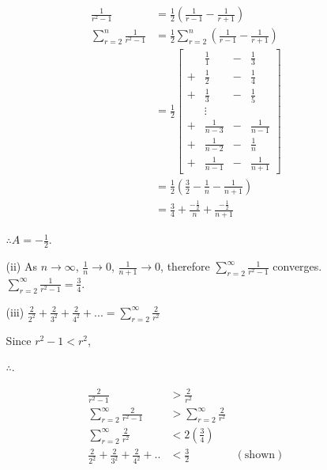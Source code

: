 \begin{enumerate}
\begin{enumerate}
\begin{align*}
\frac{1}{r^{2}-1} & =\frac{1}{2}\left(\frac{1}{r-1}-\frac{1}{r+1}\right)\\
\sum\limits _{r=2}^{n}\frac{1}{r^{2}-1} & =\frac{1}{2}\sum\limits _{r=2}^{n}\left(\frac{1}{r-1}-\frac{1}{r+1}\right)\\
 & =\frac{1}{2}\left[\begin{array}{cccc}
 & \frac{1}{1} & - & \frac{1}{3}\\
+ & \frac{1}{2} & - & \frac{1}{4}\\
+ & \frac{1}{3} & - & \frac{1}{5}\\
 & \vdots\\
+ & \frac{1}{n-3} & - & \frac{1}{n-1}\\
+ & \frac{1}{n-2} & - & \frac{1}{n}\\
+ & \frac{1}{n-1} & - & \frac{1}{n+1}
\end{array}\right]\\
 & =\frac{1}{2}\left(\frac{3}{2}-\frac{1}{n}-\frac{1}{n+1}\right)\\
 & =\frac{3}{4}+\frac{-\frac{1}{2}}{n}+\frac{-\frac{1}{2}}{n+1}
\end{align*}
 

$\therefore A=-\frac{1}{2}$. 
\item[(ii) ] As $n\to\infty$, $\frac{1}{n}\to0$, $\frac{1}{n+1}\to0$, therefore
$\sum\limits _{r=2}^{\infty}\frac{1}{r^{2}-1}$ converges. $\sum\limits _{r=2}^{\infty}\frac{1}{r^{2}-1}=\frac{3}{4}$. 
\item[(iii)]  $\frac{2}{2^{2}}+\frac{2}{3^{2}}+\frac{2}{4^{2}}+...=\sum\limits _{r=2}^{\infty}\frac{2}{r^{2}}$

Since $r^{2}-1<r^{2}$,

$\therefore$. 

\begin{align*}
\frac{2}{r^{2}-1} & >\frac{2}{r^{2}}\\
\sum\limits _{r=2}^{\infty}\frac{2}{r^{2}-1} & >\sum\limits _{r=2}^{\infty}\frac{2}{r^{2}}\\
\sum\limits _{r=2}^{\infty}\frac{2}{r^{2}} & <2\left(\frac{3}{4}\right)\\
\frac{2}{2^{2}}+\frac{2}{3^{2}}+\frac{2}{4^{2}}+.. & <\frac{3}{2} & (\text{shown})
\end{align*}

\end{enumerate}
\end{enumerate}